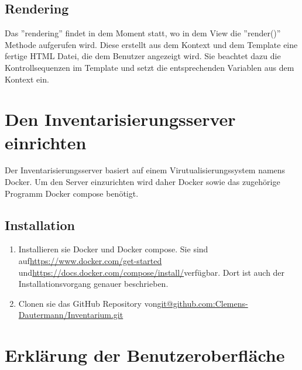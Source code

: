\documentclass{article}
\begin{document}
\subsection{Rendering}
Das ''rendering'' findet in dem Moment statt, wo in dem View die ''render()'' Methode aufgerufen wird. Diese erstellt aus dem Kontext und dem Template eine fertige HTML Datei, die dem Benutzer angezeigt wird. Sie beachtet dazu die Kontrollsequenzen im Template und setzt die entsprechenden Variablen aus dem Kontext ein.

\section{Den Inventarisierungsserver einrichten}
Der Inventarisierungsserver basiert auf einem Virutualisierungssystem namens Docker. Um den Server einzurichten wird daher Docker sowie das zugehörige Programm Docker compose benötigt.
\subsection{Installation}
\begin{enumerate}
	\item Installieren sie Docker und Docker compose. Sie sind auf\newline \url{https://www.docker.com/get-started} und\newline \url{https://docs.docker.com/compose/install/}\newline verfügbar. Dort ist auch der Installationsvorgang genauer beschrieben. 
	\item Clonen sie das GitHub Repository von\newline \url{git@github.com:Clemens-Dautermann/Inventarium.git}
	

\end{enumerate}
\section{Erklärung der Benutzeroberfläche}
\end{document}

